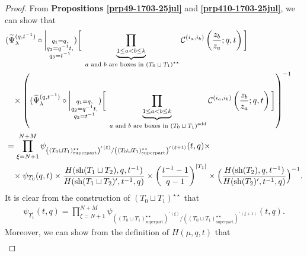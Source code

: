 \documentclass[12pt,reqno,a4paper]{amsart}
\newcommand{\comp}{\circ}
\newcommand{\cals}[1]{\mathcal{#1}}
\numberwithin{equation}{section}
\theoremstyle{definition}
\begin{document}
\begin{proof}
From \textbf{Propositions \ref{prp49-1703-25jul}} and \textbf{\ref{prp410-1703-25jul}}, we can show that 
\footnotesize
\begin{align}
&
(
\widetilde{\Psi}_{\lambda}^{(q,t^{-1})}
\comp 
\bigg|_{
	\substack{
		q_1 = q, \\
		q_2 = q^{-1}t,\\
		q_3 = t^{-1} \\
	}
}
)
\bigg[
\underbrace{	\prod_{1 \leq a < b \leq k}				}_{\text{ $a$ and $b$ are boxes in $(T_0 \sqcup T_1)^{\star\star}$}}
\cals{C}^{(i_a,i_b)}\left(
\frac{z_b}{z_a}
; q, t
\right)
\bigg]
\label{eqn327-1113-27jul}
\\
&\hspace{0.3cm}\times
\left(
(
\widetilde{\Psi}_{\lambda}^{(q,t^{-1})}
\comp 
\bigg|_{
	\substack{
		q_1 = q, \\
		q_2 = q^{-1}t,\\
		q_3 = t^{-1} \\
	}
}
)
\bigg[
\underbrace{	\prod_{1 \leq a < b \leq k}				}_{\text{ $a$ and $b$ are boxes in $(T_0 \sqcup T_1)^{\operatorname{add}}$}}
\cals{C}^{(i_a,i_b)}\left(
\frac{z_b}{z_a}
; q, t
\right)
\bigg]
\right)^{-1}
\notag 
\\
&= 
\prod_{\xi = N + 1}^{N + M}
\psi_{\left(	(T_0 \sqcup T_1)^{\star\star}_{\operatorname{super part}}			\right)^{\prime \, (\xi)}/\left(	(T_0 \sqcup T_1)^{\star\star}_{\operatorname{super part}}			\right)^{\prime \, (\xi + 1)}}(t,q)
\times
\notag 
\\
&\hspace{0.3cm}\times
\psi_{
	T_0
}(q,t)
\times 
\frac{
	H(\operatorname{sh}(T_1 \sqcup T_2),q,t^{-1})
}{
	H(\operatorname{sh}(T_1 \sqcup T_2)^\prime,t^{-1},q)
}
\times 
\left(
\frac{t^{-1} - 1}{q - 1}
\right)^{
	|T_1| 
}
\times
\Big(
\frac{
	H(\operatorname{sh}(T_2),q,t^{-1})
}{
	H(\operatorname{sh}(T_2)^\prime,t^{-1},q)
}
\Big)^{-1}. 
\notag 
\end{align}
\normalsize
It is clear from the construction of $(T_0 \sqcup T_1)^{\star\star}$ that 
\begin{align}
\psi_{T_1^\prime}(t,q) = 
\prod_{\xi = N + 1}^{N + M}
\psi_{\left(	(T_0 \sqcup T_1)^{\star\star}_{\operatorname{super part}}			\right)^{\prime \, (\xi)}/\left(	(T_0 \sqcup T_1)^{\star\star}_{\operatorname{super part}}			\right)^{\prime \, (\xi + 1)}}(t,q). 
\label{eqn328-1112-27jul}
\end{align}
Moreover, we can show from the definition of $H(\mu,q,t)$ that 
\begin{align}

\end{align}
\end{proof}
\end{document}
